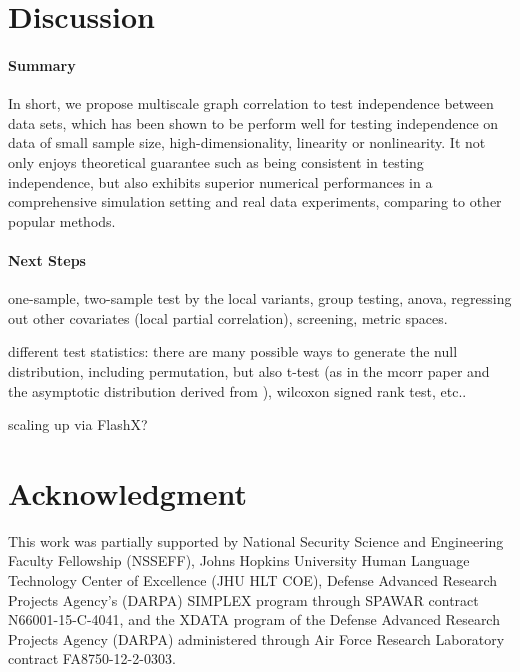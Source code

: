 \documentclass[11pt]{article}
\begin{document}
\section{Discussion}
\label{conclu}

\paragraph{Summary}

In short, we propose multiscale graph correlation to test independence between data sets, which has been shown to be perform well for testing independence on data of small sample size, high-dimensionality, linearity or nonlinearity. It not only enjoys theoretical guarantee such as being consistent in testing independence, but also exhibits superior numerical performances in a comprehensive simulation setting and real data experiments, comparing to other popular methods.


\paragraph{Next Steps}

one-sample, two-sample test by the local variants, group testing, anova, regressing out other covariates (local partial correlation), screening, metric spaces.

different test statistics: there are many possible ways to generate the null distribution, including permutation, but also t-test (as in the mcorr paper \cite{SzekelyRizzo2013a} and the asymptotic distribution derived from \cite{GrettonEtAl2012}), wilcoxon signed rank test, etc..

scaling up via FlashX?

\section*{Acknowledgment}
This work was partially supported by 
% 
National Security Science and Engineering Faculty Fellowship (NSSEFF), 
% 
Johns Hopkins University Human Language Technology Center of Excellence (JHU HLT COE), 
% 
Defense Advanced Research Projects Agency's (DARPA) SIMPLEX program through SPAWAR contract N66001-15-C-4041, 
% 
and the XDATA program of the Defense Advanced Research Projects Agency (DARPA) administered through Air Force Research Laboratory contract FA8750-12-2-0303.



\appendix
\setcounter{figure}{0}
\renewcommand\thefigure{\arabic{figure}} 
\end{document}
